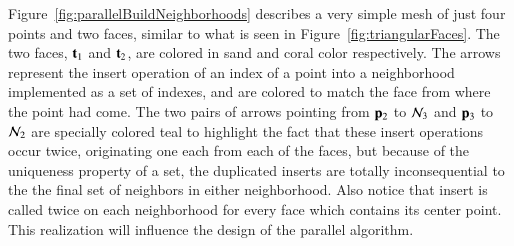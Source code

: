 
Figure~\ref{fig:parallelBuildNeighborhoods} describes a very simple mesh of just four points and two faces, similar to what is seen in Figure~\ref{fig:triangularFaces}. The two faces, $\mathbf{t}_1$ and $\mathbf{t}_2$, are colored in sand and coral color respectively. The arrows represent the insert operation of an index of a point into a neighborhood implemented as a set of indexes, and are colored to match the face from where the point had come. The two pairs of arrows pointing from $\mathbf{p}_2$ to $\mathcal{N}_3$ and $\mathbf{p}_3$ to $\mathcal{N}_2$ are specially colored teal to highlight the fact that these insert operations occur twice, originating one each from each of the faces, but because of the uniqueness property of a set, the duplicated inserts are totally inconsequential to the the final set of neighbors in either neighborhood. Also notice that insert is called twice on each neighborhood for every face which contains its center point. This realization will influence the design of the parallel algorithm.

